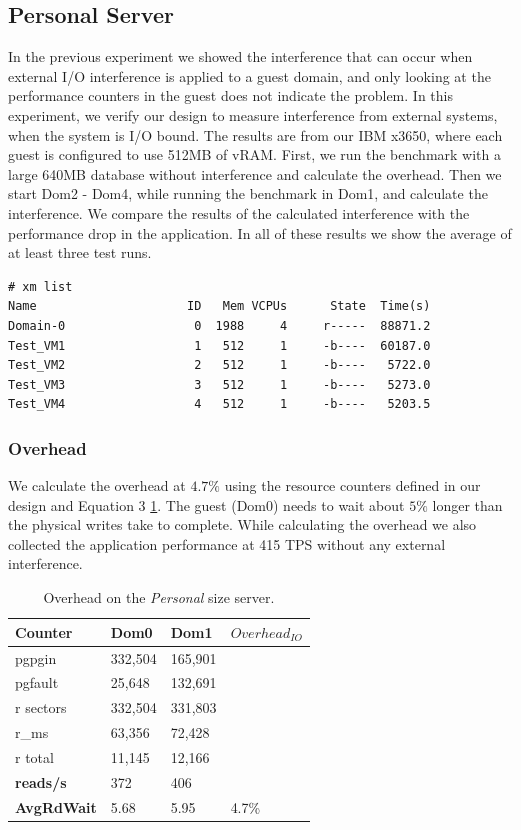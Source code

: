 \subsection{Personal Server}
In the previous experiment we showed the interference that can occur when external I/O interference is applied to a guest domain, and only looking at the performance counters in the guest does not indicate the problem.  In this experiment, we verify our design to measure interference from external systems, when the system is I/O bound.  The results are from our IBM x3650, where each guest is configured to use 512MB of vRAM.  First, we run the benchmark with a large 640MB database without interference and calculate the overhead.  Then we start Dom2 - Dom4, while running the benchmark in Dom1, and calculate the interference.  We compare the results of the calculated interference with the performance drop in the application.  In all of these results we show the average of at least three test runs.

\begin{Verbatim}
# xm list
Name                     ID   Mem VCPUs      State  Time(s)
Domain-0                  0  1988     4     r-----  88871.2
Test_VM1                  1   512     1     -b----  60187.0
Test_VM2                  2   512     1     -b----   5722.0
Test_VM3                  3   512     1     -b----   5273.0
Test_VM4                  4   512     1     -b----   5203.5
\end{Verbatim}

\subsubsection{Overhead}
We calculate the overhead at $4.7\%$ using the resource counters defined in our design and Equation 3 \ref{tab:OverheadSmall}.  The guest (Dom0) needs to wait about $5\%$ longer than the physical writes take to complete.  While calculating the overhead we also collected the application performance at 415 TPS without any external interference.

\begin{table}[h]
\begin{tabular}{ l l l p{5cm} }
  Counter     & Dom0 & Dom1 & $Overhead_{IO}$ \\
  \hline
	pgpgin    & 332,504 & 165,901  &  \\
	pgfault   &  25,648 & 132,691  & \\
	r sectors & 332,504 & 331,803  &\\
	r\_ms     &  63,356 &  72,428  & \\
	r total   &  11,145 &  12,166  & \\
    \textbf{reads/s}    & 372 & 406 & \\
    \textbf{AvgRdWait}  & 5.68 & 5.95 & 4.7\% \\ 
  \hline
\end{tabular}
\caption{Overhead on the \emph{Personal} size server.}
\label{tab:OverheadSmall}
\end{table}

